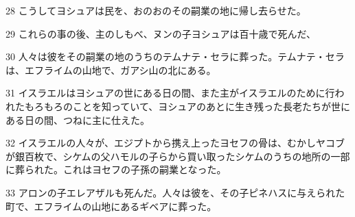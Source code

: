 \par 28 こうしてヨシュアは民を、おのおのその嗣業の地に帰し去らせた。
\par 29 これらの事の後、主のしもべ、ヌンの子ヨシュアは百十歳で死んだ、
\par 30 人々は彼をその嗣業の地のうちのテムナテ・セラに葬った。テムナテ・セラは、エフライムの山地で、ガアシ山の北にある。
\par 31 イスラエルはヨシュアの世にある日の間、また主がイスラエルのために行われたもろもろのことを知っていて、ヨシュアのあとに生き残った長老たちが世にある日の間、つねに主に仕えた。
\par 32 イスラエルの人々が、エジプトから携え上ったヨセフの骨は、むかしヤコブが銀百枚で、シケムの父ハモルの子らから買い取ったシケムのうちの地所の一部に葬られた。これはヨセフの子孫の嗣業となった。
\par 33 アロンの子エレアザルも死んだ。人々は彼を、その子ピネハスに与えられた町で、エフライムの山地にあるギベアに葬った。


